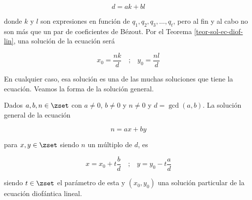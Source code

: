 $$ d = ak + bl $$

\noindent donde $k$ y $l$ son expresiones en función de $q_1, q_2, q_3,
\ldots, q_t$, pero al fin y al cabo no son más que un par de coeficientes de
Bézout. Por el Teorema \ref{teor-sol-ec-diof-lin}, una solución de la
ecuación será


$$ x_0 = \frac{nk}{d} \quad \text{;} \quad y_0 = \frac{nl}{d} $$

\fi

En cualquier caso, esa solución es una de las muchas soluciones que tiene la
ecuación. Veamos la forma de la solución general.

\begin{theorem}\label{teor-sol-gral-ec-diof-lin}
  Dados $a, b, n \in \zset$ con $a \neq 0$, $b \neq 0$ y $n \neq 0$ y $d =
  \gcd(a, b)$. La solución general de la ecuación

  $$ n = ax + by $$

  \noindent para $x, y \in \zset$ siendo $n$ un múltiplo de $d$, es

  $$ x = x_0 + t\frac{b}{d} \quad \text{;} \quad y = y_0 - t\frac{a}{d} $$

  \noindent siendo $t \in \zset$ el parámetro de esta y $(x_0, y_0)$ una
  solución particular de la ecuación diofántica lineal.
\end{theorem}


